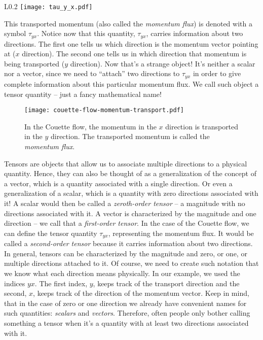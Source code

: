 \documentclass[10pt,twocolumn]{article}
\begin{document}
\begin{wrapfigure}{L}{0.2\textwidth}
\centering\texttt{[image: tau\_y\_x.pdf]}
\label{fig:tau_y_x}
\end{wrapfigure}
This transported momentum (also called the \textit{momentum flux}) is denoted with a symbol $\tau_{yx}$. Notice now that this quantity, $\tau_{yx}$, carries information about two directions. The first one tells us which direction is the momentum vector pointing at ($x$ direction). The second one tells us in which direction that momentum is being transported ($y$ direction). Now that's a strange object! It's neither a scalar nor a vector, since we need to ``attach'' two directions to $\tau_{yx}$ in order to give complete information about this particular momentum flux. We call such object a tensor quantity -- just a fancy mathematical name!
\begin{figure}[t!]
\centering\texttt{[image: couette-flow-momentum-transport.pdf]}
\caption{In the Couette flow, the momentum in the $x$ direction is transported in the $y$ direction. The transported momentum is called the \textit{momentum flux}.}
\label{fig:couette-flow-momentum-transport}
\end{figure}

Tensors are objects that allow us to associate multiple directions to a physical quantity. Hence, they can also be thought of as a generalization of the concept of a vector, which is a quantity associated with a single direction. Or even a generalization of a scalar, which is a quantity with zero directions associated with it! A scalar would then be called a \textit{zeroth-order tensor} -- a magnitude with no directions associated with it. A vector is characterized by the magnitude and one direction -- we call that a \textit{first-order tensor}. In the case of the Couette flow, we can define the tensor quantity $\tau_{yx}$, representing the momentum flux. It would be called a \textit{second-order tensor} because it carries information about two directions. In general, tensors can be characterized by the magnitude and zero, or one, or multiple directions attached to it. Of course, we need to create such notation that we know what each direction means physically. In our example, we used the indices $yx$. The first index, $y$, keeps track of the transport direction and the second, $x$, keeps track of the direction of the momentum vector. Keep in mind, that in the case of zero or one direction we already have convenient names for such quantities: \textit{scalars} and \textit{vectors}. Therefore, often people only bother calling something a tensor when it's a quantity with at least two directions associated with it.
\end{document}
